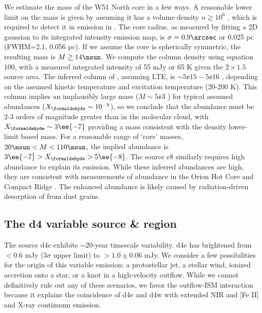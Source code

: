 We estimate the mass of the W51 North core in a few ways.  A reasonable lower limit
on the mass is given by assuming it has a volume density $n\gtrsim10^6$ \percc,
which is required to detect it in emission in \ortho \twotwo
\citep{Mangum1993a}.  The core radius, as measured by fitting a 2D gaussian to
its integrated intensity emission map, is
$\sigma=0.9\arcsec$ or 0.025 pc (FWHM=2.1\arcsec, 0.056 pc).  If we assume the core
is spherically symmetric, the resulting mass is $M\gtrsim14\msun$.
We compute the \ortho \twotwo column density using \citet{Mangum2015a} equation
100, with a measured integrated intensity of 55 mJy \kms or 65 K \kms given
the $2\times1.5$\arcsec source area.  The inferred column of \ortho,
assuming LTE, is $\sim5\ee{15} - 5\ee{16}$ \persc, depending on the assumed
kinetic temperature and excitation temperature (20-200 K).  This \formaldehyde column
implies an implausibly large mass ($M\sim5\ee{3}$ \msun) for typical assumed abundances
($X_{\formaldehyde}\sim10^{-9}$), so we conclude that the \formaldehyde abundance
must be 2-3 orders of magnitude greater than in the molecular cloud, with
$X_{\formaldehyde}\sim3\ee{-7}$ providing a mass consistent with the density
lower-limit based mass.  For a reasonable range of `core' masses, $20
\msun<M<110 \msun$, the implied abundance is $3\ee{-7} > X_{\formaldehyde} >
5\ee{-8}$.  The source e8 similarly requires high abundance to explain its
emission.  While these inferred abundances are high, they are consistent with
measurements of \formaldehyde abundance in the Orion Hot Core and Compact Ridge
\citep{Mangum1993b}.  The enhanced abundance is likely caused by radiation-driven
desorption of \formaldehyde from dust grains.






\subsection{The d4 variable source \& \hh region}
\label{sec:d4}
The source d4e exhibits $\sim$20-year timescale variability.  d4e has
brightened from $<0.6$ mJy ($3\sigma$ upper limit) to $>1.0\pm0.06$ mJy.  We
consider a few possibilities for the origin of this variable emission: a
protostellar jet,  a stellar wind, ionized accretion onto a star, or a knot in
a high-velocity outflow.  While we cannot definitively rule out any of these
scenarios, we favor the outflow-ISM interaction because it explains the
coincidence of d4e and d4w with extended NIR \hh and [Fe II] and X-ray
continuum emission.

